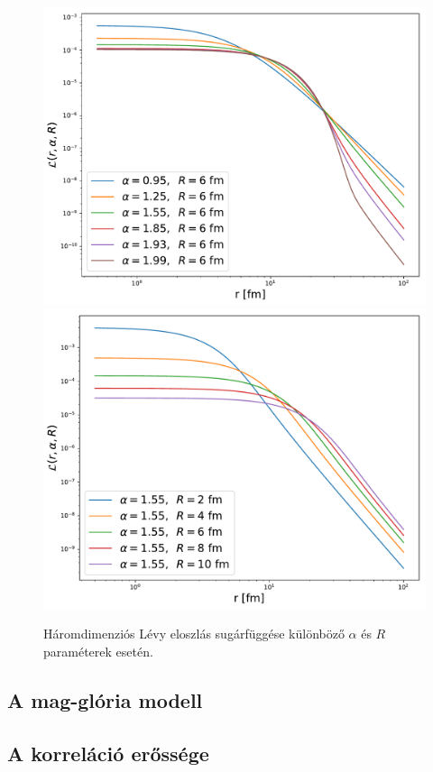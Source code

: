 \documentclass[10pt,a4paper]{article}
\numberwithin{equation}{subsection}
\numberwithin{figure}{section}
\begin{document}
\begin{figure}[H]
\centering
\includegraphics[scale=0.35]{pic/Coulomb/Levy_alpha.pdf}
\includegraphics[scale=0.35]{pic/Coulomb/Levy_R.pdf}
\caption{Háromdimenziós Lévy eloszlás sugárfüggése különböző $\alpha$ és $R$ paraméterek esetén.}
\label{fig:Levy}
\end{figure}

\subsection{A mag-glória modell}

\subsection{A korreláció erőssége}
\end{document}

